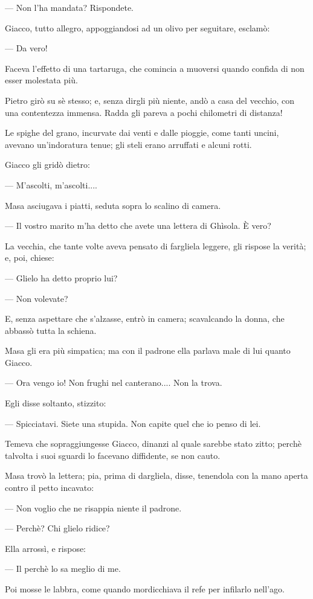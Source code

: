 — Non l’ha mandata? Rispondete.

Giacco, tutto allegro, appoggiandosi ad un olivo per seguitare, esclamò:

— Da vero!

Faceva l’effetto di una tartaruga, che comincia a muoversi quando confida di non esser molestata più.

Pietro girò su sè stesso; e, senza dirgli più niente, andò a casa del vecchio, con una contentezza immensa. Radda gli pareva a pochi chilometri di distanza!

Le spighe del grano, incurvate dai venti e dalle pioggie, come tanti uncini, avevano un’indoratura tenue; gli steli erano arruffati e alcuni rotti.

Giacco gli gridò dietro:

— M’ascolti, m’ascolti....

Masa asciugava i piatti, seduta sopra lo scalino di camera.

— Il vostro marito m’ha detto che avete una lettera di Ghìsola. È vero?

La vecchia, che tante volte aveva pensato di fargliela leggere, gli rispose la verità; e, poi, chiese:

— Glielo ha detto proprio lui?

— Non volevate?

E, senza aspettare che s’alzasse, entrò in camera; scavalcando la donna, che abbassò tutta la schiena.

Masa gli era più simpatica; ma con il padrone ella parlava male di lui quanto Giacco.

— Ora vengo io! Non frughi nel canterano.... Non la trova.

Egli disse soltanto, stizzito:

— Spicciatavi. Siete una stupida. Non capite quel che io penso di lei.

Temeva che sopraggiungesse Giacco, dinanzi al quale sarebbe stato zitto; perchè talvolta i suoi sguardi lo facevano diffidente, se non cauto.

Masa trovò la lettera; pia, prima di dargliela, disse, tenendola con la mano aperta contro il petto incavato:

— Non voglio che ne risappia niente il padrone.

— Perchè? Chi glielo ridice?

Ella arrossì, e rispose:

— Il perchè lo sa meglio di me.

Poi mosse le labbra, come quando mordicchiava il refe per infilarlo nell'ago.

